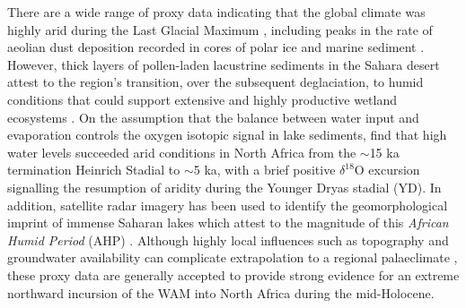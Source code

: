 \documentclass[a4paper]{article}
\newcommand{\delO}{\ensuremath{\delta ^{18}}O}
\begin{document}

There are a wide range of proxy data indicating that the global climate was highly arid during the Last Glacial Maximum \parencite{harrison2001role}, including peaks in the rate of aeolian dust deposition recorded in cores of polar ice \parencite{petit1990palaeoclimatological} and marine sediment \parencite{tiedemann1989climatic, rea1994paleoclimatic}. 
However, thick layers of pollen-laden lacustrine sediments in the Sahara desert attest to the region's transition, over the subsequent deglaciation, to humid conditions that could support extensive and highly productive wetland ecosystems \parencite{ritchie1985sediment, lezine1990across}.
On the assumption that the balance between water input and evaporation controls the oxygen isotopic signal in lake sediments, \cite{gasse1990arid} find that high water levels succeeded arid conditions in North Africa from the $\sim$15 ka termination Heinrich Stadial to $\sim$5 ka, with a brief positive \delO{} excursion signalling the resumption of aridity during the Younger Dryas stadial (YD).
In addition, satellite radar imagery has been used to identify the geomorphological imprint of immense Saharan lakes which attest to the magnitude of this \emph{African Humid Period} (AHP) \parencite{schuster2005holocene, drake2006shorelines}.
Although highly local influences such as topography and groundwater availability can complicate extrapolation to a regional palaeclimate \parencite{baumhauer1991palaeolakes}, these proxy data are generally accepted to provide strong evidence for an extreme northward incursion of the WAM into North Africa during the mid-Holocene.

\printbibliography{}
\end{document}
